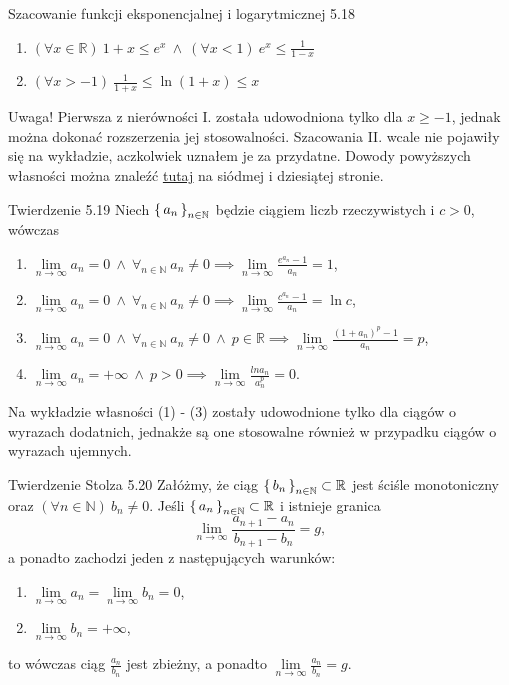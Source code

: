 \documentclass{article}
\newcommand{\R}{\mathbb{R}}
\newcommand{\N}{\mathbb{N}}
\newcommand{\lin}[1]{\lim\limits_{n\to\infty}{#1}}
\newcommand{\seq}[1]{\set{#1_n}_{n\in\N}}
\begin{document}
\begin{twier}{Szacowanie funkcji eksponencjalnej i logarytmicznej 5.18}
    \begin{enumerate}[label=\Roman*.]
        \item $(\forall x\in\R)\ 1+x\le e^x\ \land\ (\forall x<1)\ e^x\le \frac{1}{1-x}$
        \item $(\forall x>-1)\ \frac{1}{1+x}\le \ln{(1+x)}\le x$
    \end{enumerate}
\end{twier}

Uwaga! Pierwsza z nierówności I. została udowodniona tylko dla $x\ge -1$, jednak można
dokonać rozszerzenia jej stosowalności. Szacowania II. wcale nie pojawiły się na wykładzie, aczkolwiek uznałem je
za przydatne. Dowody powyższych własności można znaleźć 
\href{https://drive.google.com/file/d/1cHNY7oU4XpRmYcPfO8lCgPCpdmvKQY5q/view?usp=sharing}{{\color{blue}\underline{tutaj}}}
na siódmej i dziesiątej stronie.

\begin{twier}{Twierdzenie 5.19}
Niech $\seq{a}$ będzie ciągiem liczb rzeczywistych i $c>0$, wówczas
\begin{enumerate}[label=(\arabic*)]
    \item $\lin{a_n}=0\ \land\ \forall_{n\in\N}\ a_n\neq0\implies\lin{\frac{e^{a_n}-1}{a_n}}=1$,
    \item $\lin{a_n}=0\ \land\ \forall_{n\in\N}\ a_n\neq0\implies\lin{\frac{c^{a_n}-1}{a_n}}=\ln{c}$,
    \item $\lin{a_n}=0\ \land\ \forall_{n\in\N}\ a_n\neq0\ \land\ p\in\R\implies\lin{\frac{(1+a_n)^p-1}{a_n}}=p$,
    \item $\lin{a_n}=+\infty\ \land\ p>0\implies \lin{\frac{ln{a_n}}{a_n^p}}=0$.
\end{enumerate}
\end{twier}

Na wykładzie własności (1) - (3) zostały udowodnione tylko dla ciągów o wyrazach dodatnich, jednakże są one stosowalne
również w przypadku ciągów o wyrazach ujemnych.

\begin{twier}{Twierdzenie Stolza 5.20}
Załóżmy, że ciąg $\seq{b}\subset\R$ jest ściśle monotoniczny oraz $(\forall n\in\N)\ b_n\neq0$. Jeśli $\seq{a}\subset\R$
i istnieje granica
\begin{equation*}
    \lin{\frac{a_{n+1}-a_{n}}{b_{n+1}-b_{n}}}=g,
\end{equation*}
a ponadto zachodzi jeden z następujących warunków:
\begin{enumerate}[label=(\roman*)]
    \item $\lin{a_n}=\lin{b_n}=0$,
    \item $\lin{b_n}=+\infty$,
\end{enumerate}
to wówczas ciąg $\frac{a_n}{b_n}$ jest zbieżny, a ponadto $\lin{\frac{a_n}{b_n}}=g$.
\end{twier}
\end{document}
